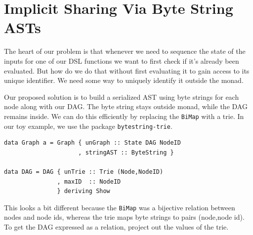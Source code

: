 \documentclass[runningheads]{llncs}
\begin{document}
\section{Implicit Sharing Via Byte String ASTs}

The heart of our problem is that whenever we need to sequence the state of the inputs
for one of our DSL functions we want to first check if it's already been
evaluated. But how do we do that without first evaluating it to gain access to
its unique identifier. We need some way to uniquely identify it outside the monad.

Our proposed solution is to build a serialized AST using byte strings for each node along with our
DAG.
The byte string stays outside monad, while the DAG remains inside.
We can do this efficiently by replacing the \texttt{BiMap}
with a trie.
In our toy example, we use the package \texttt{bytestring-trie}.

\begin{verbatim}
data Graph a = Graph { unGraph :: State DAG NodeID
                     , stringAST :: ByteString }

data DAG = DAG { unTrie :: Trie (Node,NodeID)
               , maxID  :: NodeID
               } deriving Show
\end{verbatim}
This looks a bit different because the \texttt{BiMap}
was a bijective relation between nodes and node ids,
whereas the trie maps byte strings to pairs (node,node id).
To get the DAG expressed as a relation, project out the values of the trie.
\end{document}

